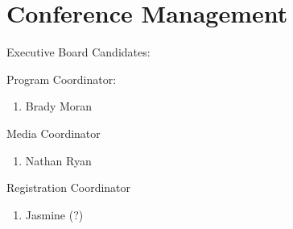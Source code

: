 \section{Conference Management}


Executive Board Candidates:

Program Coordinator:
\begin{enumerate}
\item Brady Moran
\end{enumerate}

Media Coordinator
\begin{enumerate}
\item Nathan Ryan
\end{enumerate}

Registration Coordinator
\begin{enumerate}
\item Jasmine (?)
\end{enumerate}
